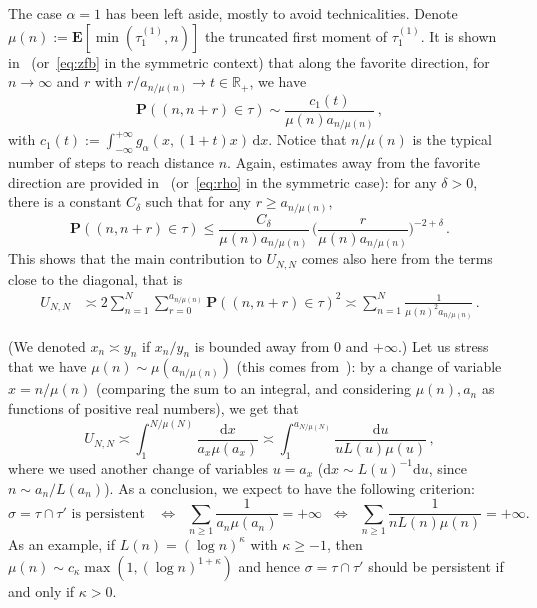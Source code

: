 \documentclass[AHL,Unicode,longabstracts]{cedram}
\newcommand{\ga}{\alpha}
\newcommand{\gd}{\delta}
\newcommand{\dd}{\mathrm{d}}
\newcommand{\bP}{\ensuremath{\mathbf{P}}}
\newcommand{\bE}{\ensuremath{\mathbf{E}}}
\newcommand{\bbR}{\ensuremath{\mathbb{R}}}
\begin{document}
\begin{appendix}
\begin{rema}\label{rem:alpha=1}
The case $\ga=1$ has been left aside, mostly to avoid technicalities. Denote $\mu(n):=\bE[\min(\tau_1^{(1)}, n)]$ the truncated first moment of $\tau_1^{(1)}$. It is shown in~\cite[Theorem~3.4]{cf:B} (or~\eqref{eq:zfb} in the symmetric context) that along the favorite direction, for $n\to \infty$ and $r$ with $r/a_{n/\mu(n)} \to t\in \bbR_+$, we have
\begin{equation}\label{alpha=1}
\bP((n,n+r)\in\tau) \sim \frac{c_1(t)}{\mu(n) a_{n/\mu(n)}}\,,
\end{equation}
with $c_1(t):= \int_{-\infty}^{+\infty} g_{\alpha}(x,(1+t)x)\, \dd x$. Notice that $n/\mu(n)$ is the typical number of steps to reach distance $n$. Again, estimates away from the favorite direction are provided in~\cite[Theorem~4.2]{cf:B} (or~\eqref{eq:rho} in the symmetric case): for any $\gd>0$, there is a constant $C_{\gd}$ such that for any $r \ge a_{n/\mu(n)}$,
\begin{equation}\label{alpha=1away}
\bP((n,n+r)\in\tau) \le \frac{C_{\gd}}{\mu(n) a_{n/\mu(n)}}\,\Big(\frac{r}{\mu(n) a_{n/\mu(n)}} \Big)^{-2+\gd}\,.
\end{equation}
This shows that the main contribution to $U_{N,N}$ comes also here from the terms close to the diagonal, that is
\begin{align*}
U_{N,N} &\asymp 2\sum_{n=1}^N \sum_{r=0}^{a_{n/\mu(n)}} \bP((n,n+r)\in\tau)^2 \asymp \sum_{n=1}^N \frac{1}{\mu(n)^2 a_{n/\mu(n)}}\,.
\end{align*}

(We denoted $x_n\asymp y_n$ if $x_n/y_n$ is bounded away from $0$ and $+\infty$.) Let us stress that we have $\mu(n) \sim \mu(a_{n/\mu(n)})$ (this comes from~\cite[Lemma~4.3]{cf:B17}): by a change of variable $x= n/\mu(n)$ (comparing the sum to an integral, and considering $\mu(n),a_n$ as functions of positive real numbers), we get that
\[
U_{N,N}\asymp \int_{1}^{N/\mu(N)} \frac{\dd x}{ a_{x} \mu(a_x)} \asymp \int_1^{a_{N/\mu(N)}} \frac{\dd u}{u L(u) \mu(u)}\,,
\]
where we used another change of variables $u \!=\!a_x$ ($\dd x \!\sim\! L(u)^{-1}\dd u$, since $n\!\sim\! a_n/L(a_n)$). As a conclusion, we expect to have the following criterion:
\[
\sigma=\tau\cap \tau' \text{ is persistent } \;\; \Longleftrightarrow \;\; \sum_{n\geq 1} \frac{1}{a_n \mu(a_n)} =+\infty \;\; \Longleftrightarrow \;\; \sum_{n\geq 1} \frac{1}{n L(n)\mu(n)} =+\infty.
\]
As an example, if $L(n) =(\log n)^{\kappa}$ with $\kappa \geq -1$, then $\mu(n) \sim c_{\kappa} \max(1, (\log n)^{1+\kappa})$ and hence $\sigma=\tau\cap \tau'$ should be persistent if and only if $\kappa>0$.
\end{rema}
\end{appendix}


\end{document}
